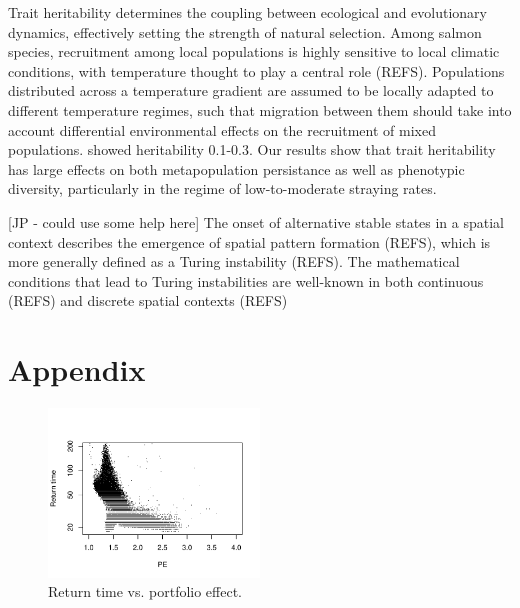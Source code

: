 \documentclass[twocolumn,preprintnumbers,amsmath,amssymb,superscriptaddress]{revtex4}
\begin{document}
Trait heritability determines the coupling between ecological and evolutionary dynamics, effectively setting the strength of natural selection.
Among salmon species, recruitment among local populations is highly sensitive to local climatic conditions, with temperature thought to play a central role (REFS).
Populations distributed across a temperature gradient are assumed to be locally adapted to different temperature regimes, such that migration between them should take into account differential environmental effects on the recruitment of mixed populations.
\citeauthor{Carlson:2008hl} showed heritability 0.1-0.3.
Our results show that trait heritability has large effects on both metapopulation persistance as well as phenotypic diversity, particularly in the regime of low-to-moderate straying rates.



[JP - could use some help here]
The onset of alternative stable states in a spatial context describes the emergence of spatial pattern formation (REFS), which is more generally defined as a Turing instability (REFS).
The mathematical conditions that lead to Turing instabilities are well-known in both continuous (REFS) and discrete spatial contexts (REFS)






\clearpage
\setcounter{figure}{0}
\section*{Appendix}



\begin{figure}
  \captionsetup{justification=raggedright,
singlelinecheck=false
}
\centering
\includegraphics[width=0.5\textwidth]{figs2/fig_rtvspe.pdf}
\caption{
Return time vs. portfolio effect.
} \label{fig:rtvspe}
\end{figure}
\end{document}
